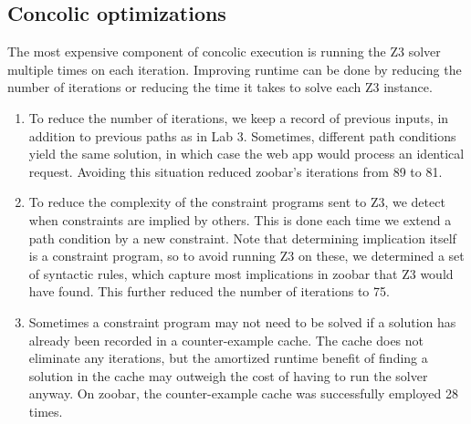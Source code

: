 \documentclass{article}
\begin{document}
\subsection{Concolic optimizations}

The most expensive component of concolic execution is running the Z3
solver multiple times on each iteration. Improving runtime can be done
by reducing the number of iterations or reducing the time it takes to
solve each Z3 instance.

\begin{enumerate}
\item To reduce the number of iterations, we keep a record of previous
  inputs, in addition to previous paths as in Lab 3. Sometimes,
  different path conditions yield the same solution, in which case
  the web app would process an identical request. Avoiding this
  situation reduced zoobar's iterations from 89 to 81.

\item To reduce the complexity of the constraint programs sent to Z3,
  we detect when constraints are implied by others. This is done each
  time we extend a path condition by a new constraint. Note that
  determining implication itself is a constraint program, so to avoid
  running Z3 on these, we determined a set of syntactic rules, which
  capture most implications in zoobar that Z3 would have found. This
  further reduced the number of iterations to 75.

\item Sometimes a constraint program may not need to be solved if a
  solution has already been recorded in a counter-example cache. The
  cache does not eliminate any iterations, but the amortized runtime
  benefit of finding a solution in the cache may outweigh the cost of
  having to run the solver anyway. On zoobar, the counter-example
  cache was successfully employed 28 times.
\end{enumerate}
\end{document}
